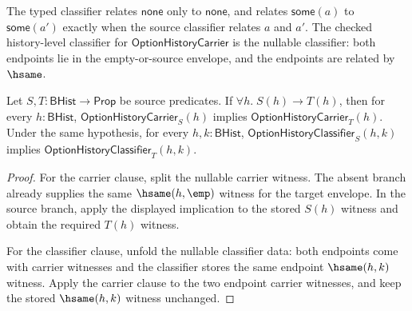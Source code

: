 \begin{definition}
\label{def:option-classifier-specification}
The typed classifier relates \(\mathsf{none}\) only to \(\mathsf{none}\), and relates \(\mathsf{some}(a)\) to \(\mathsf{some}(a')\) exactly when the source classifier relates \(a\) and \(a'\). The checked history-level classifier for $\mathsf{OptionHistoryCarrier}$ is the nullable classifier: both endpoints lie in the empty-or-source envelope, and the endpoints are related by $\hsame$.
\end{definition}

\begin{theorem}
\label{thm:option-history-carrier-source-monotonicity}
Let $S,T:\mathsf{BHist}\to\mathsf{Prop}$ be source predicates. If
$\forall h.\; S(h)\to T(h)$, then for every $h:\mathsf{BHist}$,
$\mathsf{OptionHistoryCarrier}_S(h)$ implies
$\mathsf{OptionHistoryCarrier}_T(h)$. Under the same hypothesis, for every
$h,k:\mathsf{BHist}$, $\mathsf{OptionHistoryClassifier}_S(h,k)$ implies
$\mathsf{OptionHistoryClassifier}_T(h,k)$.
\end{theorem}
\begin{proof}
For the carrier clause, split the nullable carrier witness. The absent branch
already supplies the same $\hsame(h,\emp)$ witness for the target envelope. In
the source branch, apply the displayed implication to the stored $S(h)$ witness
and obtain the required $T(h)$ witness.

For the classifier clause, unfold the nullable classifier data: both endpoints
come with carrier witnesses and the classifier stores the same endpoint
$\hsame(h,k)$ witness. Apply the carrier clause to the two endpoint carrier
witnesses, and keep the stored $\hsame(h,k)$ witness unchanged.
\end{proof}
